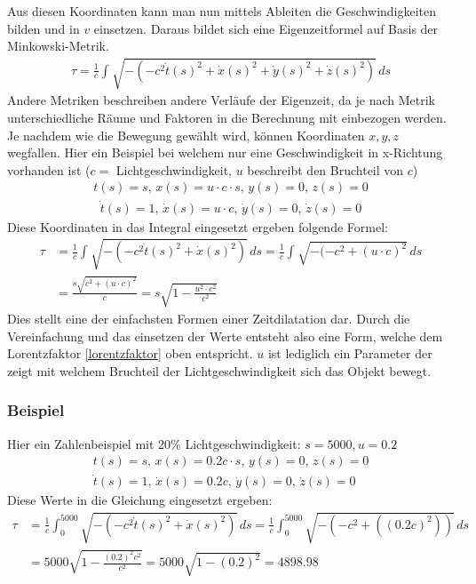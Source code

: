 \begin{refsection}
Aus diesen Koordinaten kann man nun mittels Ableiten die Geschwindigkeiten bilden und in $v$ einsetzen.
Daraus bildet sich eine Eigenzeitformel auf Basis der Minkowski-Metrik.
\begin{align*}
    \tau
    =
    \frac{1}{c}\int_{}^{}\sqrt{-(-c^2\dot{t}(s)^{2}+\dot{x}(s)^{2}+\dot{y}(s)^{2}+\dot{z}(s)^{2})}\,ds
\end{align*}
Andere Metriken beschreiben andere Verläufe der Eigenzeit, da je nach Metrik unterschiedliche Räume und Faktoren in die Berechnung mit einbezogen werden. 
Je nachdem wie die Bewegung gew\"ahlt wird, können Koordinaten $x, y, z$ wegfallen.
Hier ein Beispiel bei welchem nur eine Geschwindigkeit in x-Richtung vorhanden ist ($c =$ Lichtgeschwindigkeit, $u$ beschreibt den Bruchteil von $c$)
\begin{align*}
     t(s)= s,\,
 	 x(s)=u\cdot c \cdot s,\,
     y(s)=0,\,
     z(s)=0 
\end{align*}
\begin{align*}
     \dot{t}(s)=1,\,
     \dot{x}(s)=u\cdot c,\,
     \dot{y}(s)=0,\,
     \dot{z}(s)=0
\end{align*}
Diese Koordinaten in das Integral eingesetzt ergeben folgende Formel:
\begin{align*}
\tau
&=
\frac{1}{c}\int_{}^{}\sqrt{-(-c^2\dot{t}(s)^2+\dot{x}(s)^2)}\,ds 
=
\frac{1}{c}\int_{}^{}\sqrt{-(-c^2 +(u\cdot c)^{2}}\,ds\\
&=
\frac{s\sqrt{c^2+(u\cdot c)^{2}}}{c} 
=
s\sqrt{1-\frac{u^2\cdot c^2}{c^2}}
\end{align*}
Dies stellt eine der einfachsten Formen einer Zeitdilatation dar. Durch die Vereinfachung und das einsetzen der Werte entsteht also eine Form, welche dem Lorentzfaktor \eqref{lorentzfaktor} oben entspricht.
$u$ ist lediglich ein Parameter der zeigt mit welchem Bruchteil der Lichtgeschwindigkeit sich das Objekt bewegt.

\subsubsection{Beispiel}

Hier ein Zahlenbeispiel mit 20\% Lichtgeschwindigkeit:
$s=5000, u=0.2$ 
\begin{align*}
    t(s)=s,\,
    x(s)=0.2c \cdot s,\,
    y(s)=0,\,
    z(s)=0 
    \\
    \dot{t}(s)=1,\,
    \dot{x}(s)=0.2c,\,
    \dot{y}(s)=0,\,
    \dot{z}(s)=0
\end{align*}
Diese Werte in die Gleichung eingesetzt ergeben:
\begin{align*}
 \tau
&=
\frac{1}{c}\int_{0}^{5000}\sqrt{-(-c^2\dot{t}(s)^2+\dot{x}(s)^2)}\,ds
=
\frac{1}{c}\int_{0}^{5000}\sqrt{-(-c^2+((0.2c)^2))}\,ds\\
&=
5000\sqrt{1-\frac{(0.2)^2 c^2}{c^2}} 
=
5000\sqrt{1-(0.2)^2}
=
4898.98
\end{align*}


\end{refsection}
